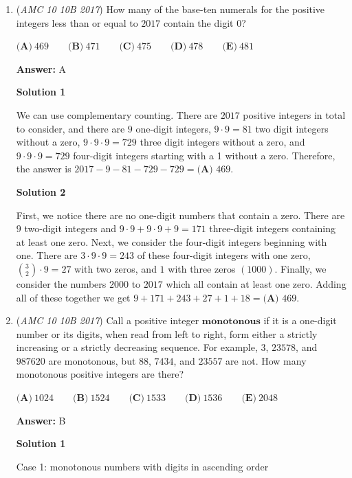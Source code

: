 \begin{enumerate}
	\item (\textit{AMC 10 10B 2017}) How many of the base-ten numerals for the positive integers less than or equal to $2017$ contain the digit $0$?


 $\textbf{(A)}\ 469\qquad\textbf{(B)}\ 471\qquad\textbf{(C)}\ 475\qquad\textbf{(D)}\ 478\qquad\textbf{(E)}\ 481$

 \textbf{Answer: }A



\textbf{Solution 1}

We can use complementary counting. There are $2017$ positive integers in total to consider, and there are $9$ one-digit integers, $9 \cdot 9 = 81$ two digit integers without a zero, $9 \cdot 9 \cdot 9 = 729$ three digit integers without a zero, and $9 \cdot 9 \cdot 9 = 729$ four-digit integers starting with a 1 without a zero. Therefore, the answer is $2017 - 9 - 81 - 729 - 729 = \boxed{\textbf{(A) }469}$.

 



\textbf{Solution 2}

First, we notice there are no one-digit numbers that contain a zero. There are $9$ two-digit integers and  $9 \cdot 9 + 9 \cdot 9 + 9 = 171$ three-digit integers containing at least one zero. Next, we consider the four-digit integers beginning with one. There are $3 \cdot 9 \cdot 9 = 243$ of these four-digit integers with one zero, ${3 \choose 2} \cdot 9 = 27$ with two zeros, and $1$ with three zeros $(1000)$. Finally, we consider the numbers $2000$ to $2017$ which all contain at least one zero. Adding all of these together we get $9 + 171 + 243 + 27 + 1 + 18 = \boxed{\textbf{(A) }469}$.

 


	\item (\textit{AMC 10 10B 2017}) Call a positive integer $\textbf{monotonous}$ if it is a one-digit number or its digits, when read from left to right, form either a strictly increasing or a strictly decreasing sequence. For example, $3$, $23578$, and $987620$ are monotonous, but $88$, $7434$, and $23557$ are not. How many monotonous positive integers are there?


 $\textbf{(A)}\ 1024\qquad\textbf{(B)}\ 1524\qquad\textbf{(C)}\ 1533\qquad\textbf{(D)}\ 1536\qquad\textbf{(E)}\ 2048$

 \textbf{Answer: }B



\textbf{Solution 1}

Case 1: monotonous numbers with digits in ascending order


\end{enumerate}
